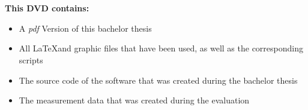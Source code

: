 
\chapter*{}
\thispagestyle{empty}

\begin{center}
  \vspace{-3cm}
\end{center}

\vfill

\textbf{This DVD contains:}
\begin{itemize}
 \item A \emph{pdf} Version of this bachelor thesis
 \item All \LaTeX\:and graphic files that have been used, as well as the corresponding scripts
 \item The source code of the software that was created during the bachelor thesis 
 \item The measurement data that was created during the evaluation
\end{itemize}
